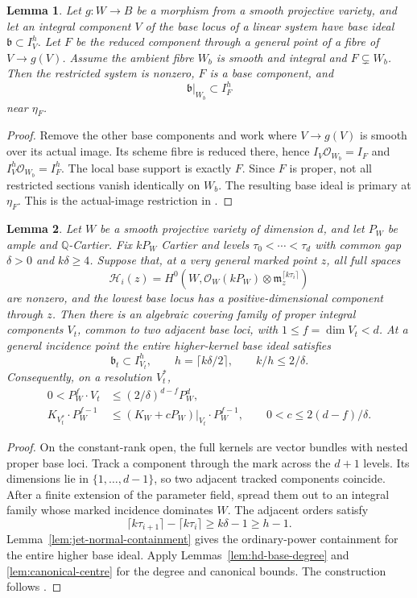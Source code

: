 \documentclass[12pt,a4paper,psamsfonts]{amsart}
\theoremstyle{definition}
\theoremstyle{plain}
\newtheorem{lemma}{Lemma}[section]
\newcommand{\OO}{\mathcal O}
\begin{document}
\begin{lemma}\label{lem:restricted-components}
Let $g:W\to B$ be a morphism from a smooth projective variety,
and let an integral component $V$ of the base locus of a linear
system have base ideal $\mathfrak b\subset I_V^h$.
Let $F$ be the reduced component through a general point of a
fibre of $V\to g(V)$. Assume the ambient fibre $W_b$ is smooth
and integral and $F\subsetneq W_b$. Then the restricted system
is nonzero, $F$ is a base component, and
\[
 \mathfrak b|_{W_b}\subset I_F^h
\]
near $\eta_F$.
\end{lemma}
\begin{proof}
Remove the other base components and work where $V\to g(V)$ is
smooth over its actual image. Its scheme fibre is reduced there,
hence $I_V\OO_{W_b}=I_F$ and $I_V^h\OO_{W_b}=I_F^h$.
The local base support is exactly $F$.
Since $F$ is proper, not all restricted sections vanish identically
on $W_b$. The resulting base ideal is primary at $\eta_F$.
This is the actual-image restriction in \cite[Lemma~7.4]{LA}.
\end{proof}

\begin{lemma}\label{lem:full-kernels}
Let $W$ be a smooth projective variety of dimension $d$, and let
$P_W$ be ample and $\mathbb{Q}$-Cartier. Fix $kP_W$ Cartier and levels
$\tau_0<\cdots<\tau_d$ with common gap $\delta>0$ and
$k\delta\ge4$. Suppose that, at a very general marked point $z$,
all full spaces
\[
 \mathcal H_i(z)=H^0(W,\OO_W(kP_W)\otimes\mathfrak m_z^{\lceil k\tau_i\rceil})
\]
are nonzero, and the lowest base locus has a positive-dimensional
component through $z$. Then there is an algebraic covering family
of proper integral components $V_t$, common to two adjacent base
loci, with $1\le f=\dim V_t<d$. At a general incidence point the
entire higher-kernel base ideal satisfies
\[
 \mathfrak b_t\subset I_{V_t}^h,\qquad
 h=\lceil k\delta/2\rceil,\qquad k/h\le2/\delta.
\]
Consequently, on a resolution $V_t^*$,
\begin{equation}\label{eq:full-kernel-bounds}
 \begin{split}
 0<P_W^f\cdot V_t&\le(2/\delta)^{d-f}P_W^d,\\
 K_{V_t^*}\cdot P_W^{f-1}&\le(K_W+cP_W)|_{V_t}\cdot P_W^{f-1},
 \qquad 0<c\le2(d-f)/\delta.
 \end{split}
\end{equation}
\end{lemma}
\begin{proof}
On the constant-rank open, the full kernels are vector bundles
with nested proper base loci. Track a component through the mark
across the $d+1$ levels. Its dimensions lie in
$\{1,\ldots,d-1\}$, so two adjacent tracked components coincide.
After a finite extension of the parameter field, spread them out
to an integral family whose marked incidence dominates $W$.
The adjacent orders satisfy
\[
 \lceil k\tau_{i+1}\rceil-\lceil k\tau_i\rceil
 \ge k\delta-1\ge h-1.
\]
Lemma~\ref{lem:jet-normal-containment} gives the ordinary-power
containment for the entire higher base ideal. Apply
Lemmas~\ref{lem:hd-base-degree} and \ref{lem:canonical-centre}
for the degree and canonical bounds. The construction follows
\cite[Lemmas~4.5--4.6]{NS}.
\end{proof}
\end{document}
